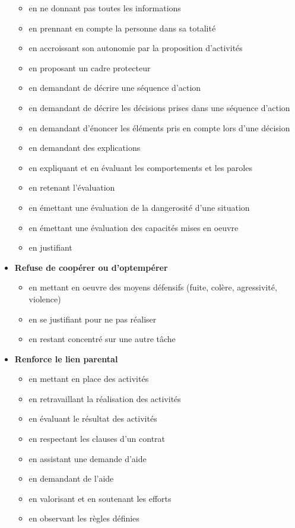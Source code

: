 \documentclass[8pt,a4paper]{article}
\begin{document}
\begin{itemize}
\begin{itemize}
\item en ne donnant pas toutes les informations
\item en prennant en compte la personne dans sa totalité
\item en accroissant son autonomie par la proposition d'activités 
\item en proposant un cadre protecteur
\item en demandant de décrire une séquence d'action
\item en demandant de décrire les décisions prises dans une séquence d'action
\item en demandant d'énoncer les éléments pris en compte lors d'une décision
\item en demandant des explications
\item en expliquant et en évaluant les comportements et les paroles 
\item en retenant l'évaluation
\item en émettant une évaluation de la dangerosité d'une situation
\item en émettant une évaluation des capacités mises en oeuvre
\item en justifiant
\\ 
 \end{itemize}
\item \textbf{Refuse de coopérer ou d'optempérer}
\begin{itemize}
\item en mettant en oeuvre des moyens défensifs (fuite, colère, agressivité, violence)
\item en se justifiant pour ne pas réaliser
\item en restant concentré sur une autre tâche
\\ 
 \end{itemize}
\item \textbf{Renforce le lien parental}
\begin{itemize}
\item en mettant en place des activités  
\item en retravaillant la réalisation des activités
\item en évaluant le résultat des activités
\item en respectant les clauses d'un contrat
\item en assistant une demande d'aide
\item en demandant de l'aide
\item en valorisant et en soutenant les efforts 
\item en observant les règles définies

\end{itemize}
\end{itemize}
\end{document}
